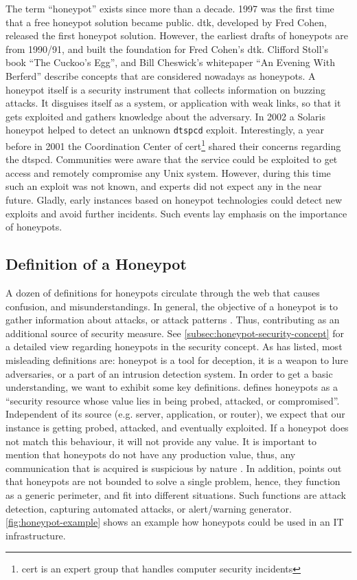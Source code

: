 The term \enquote{honeypot} exists since more than a decade.
1997 was the first time that a free honeypot solution became public.
\ac{dtk}, developed by Fred Cohen, released the first honeypot solution.
However, the earliest drafts of honeypots are from 1990/91, and built the foundation for Fred Cohen's \ac*{dtk}.
Clifford Stoll's book \enquote{The Cuckoo's Egg}\cite{stroll2000}, and Bill Cheswick's whitepaper \enquote{An Evening With Berferd}\cite{Cheswick92} describe concepts that are considered nowadays as honeypots.\cite{Spitzner2003}
A honeypot itself is a security instrument that collects information on buzzing attacks.
It disguises itself as a system, or application with weak links, so that it gets exploited and gathers knowledge about the adversary.
In 2002 a Solaris honeypot helped to detect an unknown \verb|dtspcd| exploit.
Interestingly, a year before in 2001 the Coordination Center of \acs{cert}\footnote{\acl{cert} is an expert group that handles computer security incidents\cite{cert2021}} shared their concerns regarding the dtspcd.
Communities were aware that the service could be exploited to get access and remotely compromise any Unix system.
However, during this time such an exploit was not known, and experts did not expect any in the near future.
Gladly, early instances based on honeypot technologies could detect new exploits and avoid further incidents.
Such events lay emphasis on the importance of honeypots.

\subsection{Definition of a Honeypot}

A dozen of definitions for honeypots circulate through the web that causes confusion, and misunderstandings.
In general, the objective of a honeypot is to gather information about attacks, or attack patterns \cite{NawrockiWSKS2016}.
Thus, contributing as an additional source of security measure.
See \autoref{subsec:honeypot-security-concept} for a detailed view regarding honeypots in the security concept.
As \citet{Spitzner2003} has listed, most misleading definitions are: honeypot is a tool for deception, it is a weapon to lure adversaries, or a part of an intrusion detection system.
In order to get a basic understanding, we want to exhibit some key definitions.
\citet{Spitzner2003} defines honeypots as a \enquote{security resource whose value lies in being probed, attacked, or compromised}.
Independent of its source (e.g. server, application, or router), we expect that our instance is getting probed, attacked, and eventually exploited.
If a honeypot does not match this behaviour, it will not provide any value.
It is important to mention that honeypots do not have any production value, thus, any communication that is acquired is suspicious by nature \cite{Spitzner2003}.
In addition, \citet{Spitzner2003} points out that honeypots are not bounded to solve a single problem, hence, they function as a generic perimeter, and fit into different situations.
Such functions are attack detection, capturing automated attacks, or alert/warning generator.
\autoref{fig:honeypot-example} shows an example how honeypots could be used in an IT infrastructure.

